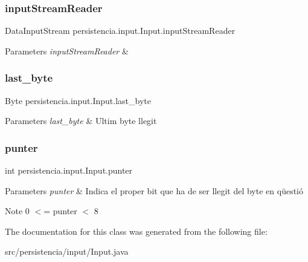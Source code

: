 \subsubsection{\texorpdfstring{input\+Stream\+Reader}{inputStreamReader}}
{\footnotesize\ttfamily Data\+Input\+Stream persistencia.\+input.\+Input.\+input\+Stream\+Reader\hspace{0.3cm}{\ttfamily [private]}}


\begin{DoxyParams}{Parameters}
{\em input\+Stream\+Reader} & \\
\hline
\end{DoxyParams}
\mbox{\label{classpersistencia_1_1input_1_1Input_a45d4bdcdb96823fc8ffe5c1a430727f2}} 
\subsubsection{\texorpdfstring{last\+\_\+byte}{last\_byte}}
{\footnotesize\ttfamily Byte persistencia.\+input.\+Input.\+last\+\_\+byte\hspace{0.3cm}{\ttfamily [private]}}


\begin{DoxyParams}{Parameters}
{\em last\+\_\+byte} & Ultim byte llegit \\
\hline
\end{DoxyParams}
\mbox{\label{classpersistencia_1_1input_1_1Input_abe76388d0ac9eeafdba673ad2138f8dc}} 
\subsubsection{\texorpdfstring{punter}{punter}}
{\footnotesize\ttfamily int persistencia.\+input.\+Input.\+punter\hspace{0.3cm}{\ttfamily [private]}}


\begin{DoxyParams}{Parameters}
{\em punter} & Indica el proper bit que ha de ser llegit del byte en qüestió \\
\hline
\end{DoxyParams}
\begin{DoxyNote}{Note}
0 $<$= punter $<$ 8 
\end{DoxyNote}


The documentation for this class was generated from the following file\+:\begin{DoxyCompactItemize}
\item 
src/persistencia/input/Input.\+java\end{DoxyCompactItemize}
